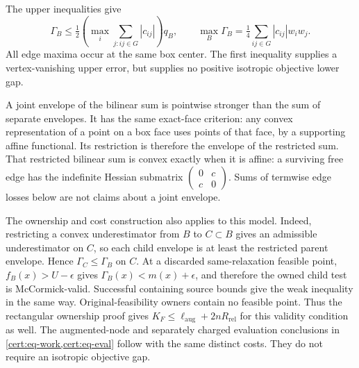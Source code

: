 The upper inequalities give
\begin{equation}\label{geom:eq-mcc-upper}
 \Gamma_B\leq\tfrac12\left(\max_i\sum_{j:ij\in G}|c_{ij}|\right)q_B,
 \qquad
 \max_B\Gamma_B=\tfrac14\sum_{ij\in G}|c_{ij}|w_iw_j.
\end{equation}
All edge maxima occur at the same box center. The first inequality
supplies a vertex-vanishing upper error, but supplies no positive
isotropic objective lower gap.

A joint envelope of the bilinear sum is pointwise stronger than the
sum of separate envelopes. It has the same exact-face criterion:
any convex representation of a point on a box face uses points of
that face, by a supporting affine functional. Its restriction is
therefore the envelope of the restricted sum. That restricted bilinear
sum is convex exactly when it is affine: a surviving free edge has
the indefinite Hessian submatrix $\left(\begin{smallmatrix}0&c\\c&0
\end{smallmatrix}\right)$. Sums of termwise edge losses below are not
claims about a joint envelope.

The ownership and cost construction also applies to this model.
Indeed, restricting a convex underestimator from $B$ to $C\subset B$
gives an admissible underestimator on $C$, so each child envelope is at
least the restricted parent envelope. Hence $\Gamma_C\leq\Gamma_B$
on $C$. At a discarded same-relaxation feasible point,
$f_B(x)>U-\epsilon$ gives $\Gamma_B(x)<m(x)+\epsilon$, and therefore
the owned child test is McCormick-valid. Successful containing source
bounds give the weak inequality in the same way. Original-feasibility
owners contain no feasible point. Thus the rectangular ownership proof
gives $K_F\leq\ell_{\mathrm{aug}}+2nR_{\mathrm{rel}}$ for this
validity condition as well. The augmented-node and separately charged
evaluation conclusions in \cref{cert:eq-work,cert:eq-eval} follow with
the same distinct costs. They do not require an isotropic objective gap.

